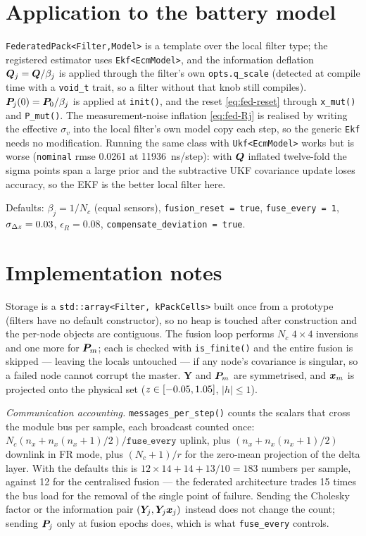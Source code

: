 \section{Application to the battery model}
\texttt{FederatedPack<Filter,Model>} is a template over the local filter type; the registered
estimator uses \texttt{Ekf<EcmModel>}, and the information deflation $\bm{Q}_j=\bm{Q}/\beta_j$ is
applied through the filter's own \texttt{opts.q\_scale} (detected at compile time with a
\texttt{void\_t} trait, so a filter without that knob still compiles). $\bm{P}_j(0)=\bm{P}_0/\beta_j$ is
applied at \texttt{init()}, and the reset \eqref{eq:fed-reset} through \texttt{x\_mut()} and
\texttt{P\_mut()}. The measurement-noise inflation \eqref{eq:fed-Rj} is realised by writing the
effective $\sigma_v$ into the local filter's own model copy each step, so the generic
\texttt{Ekf} needs no modification. Running the same class with \texttt{Ukf<EcmModel>} works but
is worse (\texttt{nominal} rmse \num{0.0261} at \SI{11936}{\nano\second}/step): with $\bm{Q}$
inflated twelve-fold the sigma points span a large prior and the subtractive UKF covariance update
loses accuracy, so the EKF is the better local filter here.

Defaults: $\beta_j=1/N_c$ (equal sensors), \texttt{fusion\_reset = true},
\texttt{fuse\_every = 1}, $\sigma_{\Delta z}=\num{0.03}$, $\epsilon_R=\num{0.08}$,
\texttt{compensate\_deviation = true}.

\section{Implementation notes}
Storage is a \texttt{std::array<Filter, kPackCells>} built once from a prototype (filters have no
default constructor), so no heap is touched after construction and the per-node objects are
contiguous. The fusion loop performs $N_c$ $4\times4$ inversions and one more for $\bm{P}_m$; each is
checked with \texttt{is\_finite()} and the entire fusion is skipped --- leaving the locals
untouched --- if any node's covariance is singular, so a failed node cannot corrupt the master.
$\bm{Y}$ and $\bm{P}_m$ are symmetrised, and $\bm{x}_m$ is projected onto the physical set
($z\in[-0.05,1.05]$, $|h|\le1$).

\emph{Communication accounting.} \texttt{messages\_per\_step()} counts the scalars that cross the
module bus per sample, each broadcast counted once:
$N_c(n_x + n_x(n_x{+}1)/2)/\texttt{fuse\_every}$ uplink, plus $(n_x+n_x(n_x{+}1)/2)$ downlink in FR
mode, plus $(N_c+1)/r$ for the zero-mean projection of the delta layer. With the defaults this is
$12\times14 + 14 + 13/10 = 183$ numbers per sample, against \num{12} for the centralised fusion
--- the federated architecture trades \num{15} times the bus load for the removal of the single
point of failure. Sending the Cholesky factor or the information pair $(\bm{Y}_j,\bm{Y}_j\bm{x}_j)$
instead does not change the count; sending $\bm{P}_j$ only at fusion epochs does, which is what
\texttt{fuse\_every} controls.

